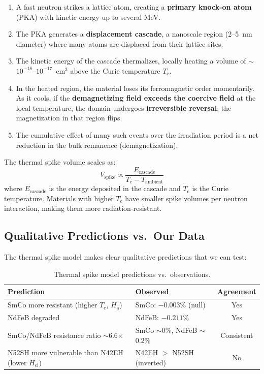 \documentclass[11pt,letterpaper]{article}
\newcommand{\Tc}{T_\mathrm{c}}
\newcommand{\Ha}{H_\mathrm{a}}
\newcommand{\Hci}{H_\mathrm{ci}}
\begin{document}
\begin{enumerate}
    \item A fast neutron strikes a lattice atom, creating a \textbf{primary
    knock-on atom} (PKA) with kinetic energy up to several MeV.
    \item The PKA generates a \textbf{displacement cascade}, a nanoscale
    region (2--\SI{5}{nm} diameter) where many atoms are displaced from their
    lattice sites.
    \item The kinetic energy of the cascade thermalizes, locally heating a
    volume of $\sim$$10^{-18}$--$10^{-17}$~cm$^3$ above the Curie
    temperature $\Tc$.
    \item In the heated region, the material loses its ferromagnetic order
    momentarily. As it cools, if the \textbf{demagnetizing field exceeds the
    coercive field} at the local temperature, the domain undergoes
    \textbf{irreversible reversal}: the magnetization in that region flips.
    \item The cumulative effect of many such events over the irradiation period
    is a net reduction in the bulk remanence (demagnetization).
\end{enumerate}

The thermal spike volume scales as:
\begin{equation}
    V_\mathrm{spike} \propto \frac{E_\mathrm{cascade}}{T_\mathrm{c} - T_\mathrm{ambient}}
\end{equation}
where $E_\mathrm{cascade}$ is the energy deposited in the cascade and $\Tc$
is the Curie temperature. Materials with higher $\Tc$ have smaller spike
volumes per neutron interaction, making them more radiation-resistant.

\subsection{Qualitative Predictions vs.\ Our Data}

The thermal spike model makes clear qualitative predictions that we can test:

\begin{table}[H]
\centering
\caption{Thermal spike model predictions vs.\ observations.}
\label{tab:spike_predictions}
\begin{tabular}{@{}p{5cm}p{4cm}c@{}}
\toprule
\textbf{Prediction} & \textbf{Observed} & \textbf{Agreement} \\
\midrule
SmCo more resistant (higher $\Tc$, $\Ha$) & SmCo: $-0.003\%$ (null) & Yes \\
NdFeB degraded & NdFeB: $-0.211\%$ & Yes \\
SmCo/NdFeB resistance ratio $\sim$6.6$\times$ & SmCo $\sim$0\%, NdFeB $\sim$0.2\% & Consistent \\
N52SH more vulnerable than N42EH (lower $\Hci$) & N42EH $>$ N52SH (inverted) & No \\
\bottomrule
\end{tabular}
\end{table}
\end{document}
